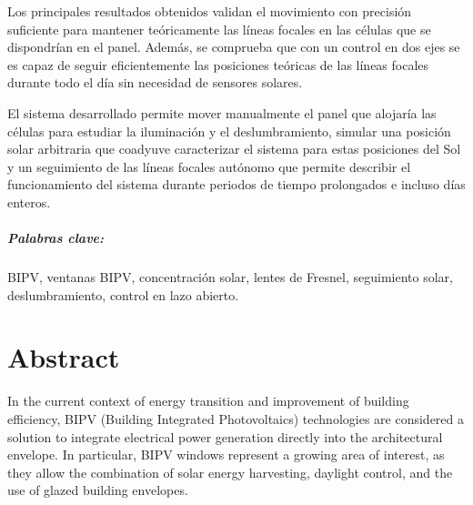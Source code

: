 Los principales resultados obtenidos validan el movimiento con precisión suficiente para mantener teóricamente las líneas focales en las células que se dispondrían en el panel. Además, se comprueba que con un control en dos ejes se es capaz de seguir eficientemente las posiciones teóricas de las líneas focales durante todo el día sin necesidad de sensores solares. 

El sistema desarrollado permite mover manualmente el panel que alojaría las células para estudiar la iluminación y el deslumbramiento, simular una posición solar arbitraria que coadyuve caracterizar el sistema para estas posiciones del Sol y un seguimiento de las líneas focales autónomo que permite describir el funcionamiento del sistema durante periodos de tiempo prolongados e incluso días enteros.





\paragraph{Palabras clave:} BIPV, ventanas BIPV, concentración solar, lentes de Fresnel, seguimiento solar, deslumbramiento, control en lazo abierto.

\chapter{Abstract}

In the current context of energy transition and improvement of building efficiency, BIPV (Building Integrated Photovoltaics) technologies are considered a solution to integrate electrical power generation directly into the architectural envelope. In particular, BIPV windows represent a growing area of interest, as they allow the combination of solar energy harvesting, daylight control, and the use of glazed building envelopes.

